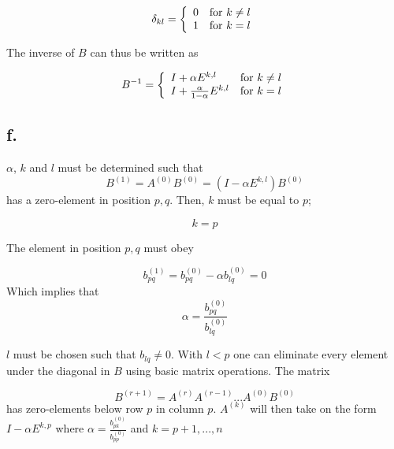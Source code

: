 \documentclass[00-main.tex]{subfiles}
\begin{document}
\begin{equation}
\delta_{kl}  = 
\left\{ \begin{array}{lll}
	0 & {\rm for} ~k \neq l \\
	1 & {\rm for} ~k = l   
\end{array} \right.
\end{equation}

The inverse of $B$ can thus be written as

\begin{equation}
B^{-1}  = 
\left\{ \begin{array}{lll}
	I + \alpha E^{k,l} & {\rm for} ~k \neq l \\
	I + \frac{\alpha}{1 - \alpha} E^{k,l} & {\rm for} ~k = l   
\end{array} \right.
\end{equation}

\subsection*{f.}
$\alpha$, $k$ and $l$ must be determined such that 
\begin{equation}
B^{(1)} = A^{(0)}B^{(0)} = (I - \alpha E^{k,l}) B^{(0)}
\end{equation}
has a zero-element in position $p,q$. Then, $k$ must be equal to $p$; 

\begin{equation}
k=p
\end{equation}

The element in position $p,q$ must obey

\begin{equation}
b^{(1)}_{pq} = b^{(0)}_{pq} - \alpha b^{(0)}_{lq} = 0
\end{equation}
Which implies that
\begin{equation}
\alpha = \frac{b^{(0)}_{pq}}{b^{(0)}_{lq}} %
\end{equation}

$l$ must be chosen such that $b_{lq} \neq 0$. With $l<p$ one can eliminate every element under the diagonal in $B$ using basic matrix operations. The matrix

\begin{equation}
B^{(r+1)} = A^{(r)}A^{(r-1)} ... A^{(0)}B^{(0)}
\end{equation}
has zero-elements below row $p$ in column $p$. $A^{(k)}$ will then take on the form $I - \alpha E^{k,p}$ where $\alpha = \frac{b^{(0)}_{pk}}{b^{(0)}_{pp}}$ and $k=p+1, ..., n$
\end{document}

